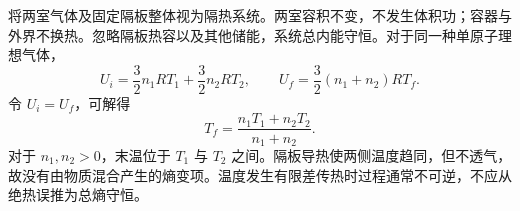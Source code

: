 将两室气体及固定隔板整体视为隔热系统。两室容积不变，不发生体积功；容器与外界不换热。忽略隔板热容以及其他储能，系统总内能守恒。对于同一种单原子理想气体，
\[
U_i=\frac32n_1RT_1+\frac32n_2RT_2,\qquad
U_f=\frac32(n_1+n_2)RT_f.
\]
令 $U_i=U_f$，可解得
\[
\boxed{T_f=\frac{n_1T_1+n_2T_2}{n_1+n_2}}.
\]
对于 $n_1,n_2>0$，末温位于 $T_1$ 与 $T_2$ 之间。隔板导热使两侧温度趋同，但不透气，故没有由物质混合产生的熵变项。温度发生有限差传热时过程通常不可逆，不应从绝热误推为总熵守恒。
